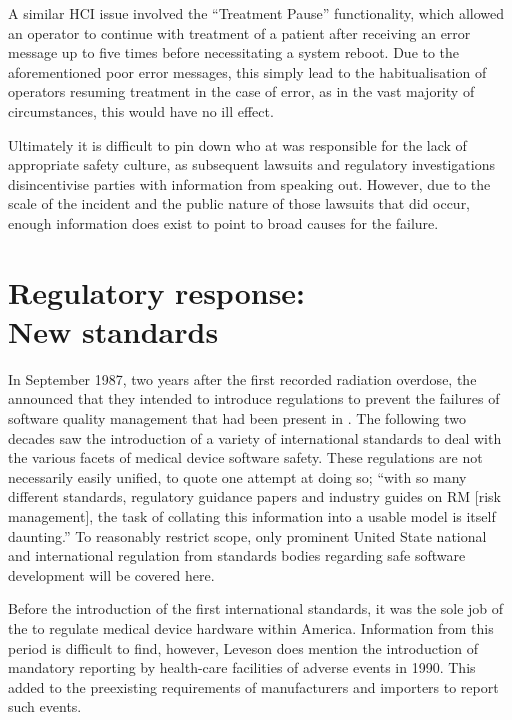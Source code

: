 \documentclass{cshonours}
\begin{document}
A similar HCI issue involved the ``Treatment Pause'' functionality, which allowed an operator to continue with treatment of a patient after receiving an error message up to five times before necessitating a system reboot. Due to the aforementioned poor error messages, this simply lead to the habitualisation of operators resuming treatment in the case of error, as in the vast majority of circumstances, this would have no ill effect. \cite[p.~301]{saferworld}

Ultimately it is difficult to pin down who at \aecl was responsible for the lack of appropriate safety culture, as subsequent lawsuits and regulatory investigations disincentivise parties with information from speaking out. However, due to the scale of the incident and the public nature of those lawsuits that did occur, enough information does exist to point to broad causes for the failure.


\chapter{Regulatory response:\\New standards}
\label{chap:newstandards}
In September 1987, two years after the first recorded \ther radiation overdose, the \fda announced that they intended to introduce regulations to prevent the failures of software quality management that had been present in \aecl. \cite{jacky1989programmed} The following two decades saw the introduction of a variety of international standards to deal with the various facets of medical device software safety. These regulations are not necessarily easily unified, to quote one attempt at doing so; ``with so many different standards, regulatory guidance papers and industry guides on RM [risk management], the task of collating this information into a usable model is itself daunting.'' \cite{burton2006risk} To reasonably restrict scope, only prominent United State national and international regulation from standards bodies regarding safe software development will be covered here.

Before the introduction of the first international standards, it was the sole job of the \fda to regulate medical device hardware within America. Information from this period is difficult to find, however, Leveson does mention the introduction of mandatory reporting by health-care facilities of adverse events in 1990. \cite[p.~TODO]{safeware}  This added to the preexisting requirements of manufacturers and importers to report such events.
\end{document}
